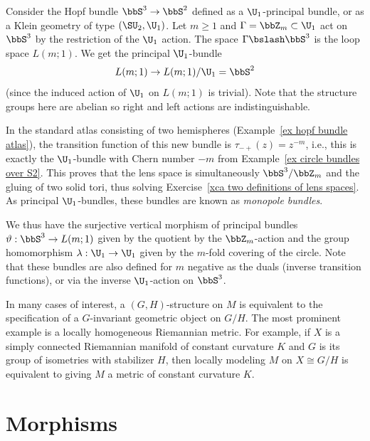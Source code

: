\begin{example}\label{ex monopole bundles}
    Consider the Hopf bundle $\bbS^3\to \bbS^2$ defined as a $\U_1$-principal bundle, or as a Klein geometry of type $(\SU_2,\U_1)$. Let $m\geq 1$ and $\Gamma=\bbZ_m\subset \U_1$ act on $\bbS^3$ by the restriction of the $\U_1$ action. The space $\Gamma\bslash \bbS^3$ is the loop space $L(m;1)$. We get the principal $\U_1$-bundle
    \[L(m;1)\to L(m;1)\slash \U_1=\bbS^2\]
    (since the induced action of $\U_1$ on $L(m;1)$ is trivial).
    Note that the structure groups here are abelian so right and left actions are indistinguishable.
    
    In the standard atlas consisting of two hemispheres (Example~\ref{ex hopf bundle atlas}), the transition function of this new bundle is $\tau_{-+}(z)=z^{-m}$, i.e., this is exactly the $\U_1$-bundle with Chern number $-m$ from Example~\ref{ex circle bundles over S2}. This proves that the lens space is simultaneously $\bbS^3\slash \bbZ_m$ and the gluing of two solid tori, thus solving Exercise~\ref{xca two definitions of lens spaces}. As principal $\U_1$-bundles, these bundles are known as \emph{monopole bundles}.

    We thus have the surjective vertical morphism of principal bundles $\vartheta:\bbS^3\to L(m;1)$ given by the quotient by the $\bbZ_m$-action and the group homomorphism $\lambda:\U_1\to \U_1$ given by the $m$-fold covering of the circle. Note that these bundles are also defined for $m$ negative as the duals (inverse transition functions), or via the inverse $\U_1$-action on $\bbS^3$.
\end{example}

\begin{example}
    In many cases of interest, a $(G,H)$-structure on $M$ is equivalent to the specification of a $G$-invariant geometric object on $G\slash H$. The most prominent example is a locally homogeneous Riemannian metric. For example, if $X$ is a simply connected Riemannian manifold of constant curvature $K$ and $G$ is its group of isometries with stabilizer $H$, then locally modeling $M$ on $X\cong G\slash H$ is equivalent to giving $M$ a metric of constant curvature $K$.
\end{example}







\section{Morphisms}\label{sec: morphisms of klein geom}

